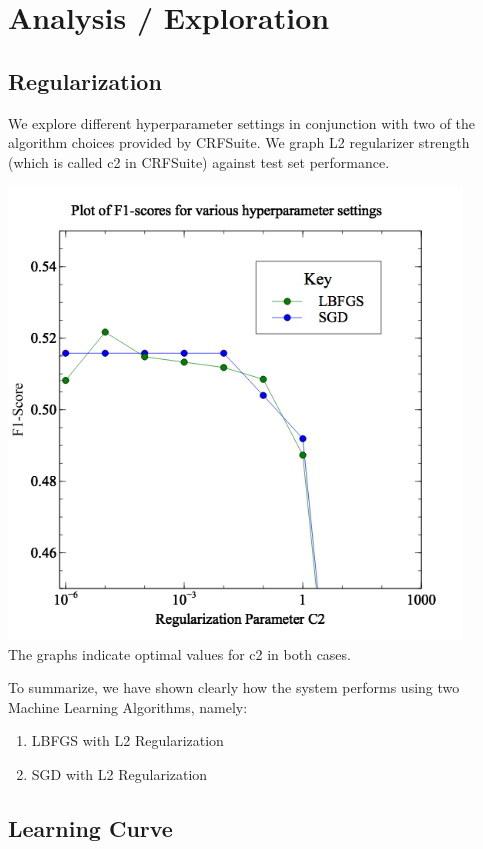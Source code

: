 \documentclass[a4paper]{article}
\begin{document}
\section{Analysis / Exploration}

\subsection{Regularization}

We explore different hyperparameter settings in conjunction with two of the algorithm choices provided by CRFSuite. We graph L2 regularizer strength (which is called c2 in CRFSuite) against test set performance. 

{\centering
\includegraphics[width=0.90\textwidth]{regularization-graph.png}
} \\

The graphs indicate optimal values for c2 in both cases. 

To summarize, we have shown clearly how the system performs using two Machine Learning Algorithms, namely:  
\begin {enumerate}
\item LBFGS with L2 Regularization
\item SGD with L2 Regularization
\end {enumerate}


\subsection{Learning Curve}
\end{document}
